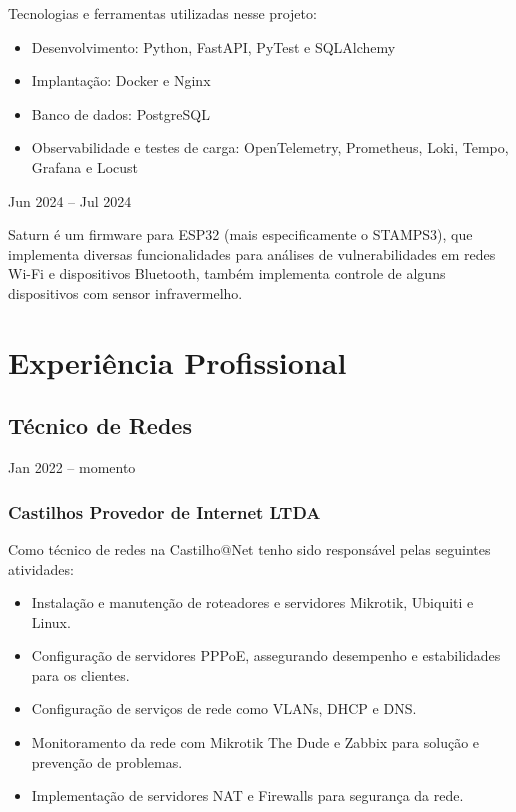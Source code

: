 \documentclass{cv}
\begin{document}
\vspace{0.08cm}

Tecnologias e ferramentas utilizadas nesse projeto:

\begin{itemize}
  \item Desenvolvimento: Python, FastAPI, PyTest e SQLAlchemy
  \item Implantação: Docker e Nginx
  \item Banco de dados: PostgreSQL
  \item Observabilidade e testes de carga: OpenTelemetry, Prometheus,
    Loki, Tempo, Grafana e Locust
\end{itemize}

\hfill{Jun 2024 -- Jul 2024}\\
\vspace{0.15cm}

Saturn é um firmware para ESP32 (mais especificamente o STAMPS3), que implementa diversas funcionalidades
para análises de vulnerabilidades em redes Wi-Fi e dispositivos Bluetooth,
também implementa controle de alguns dispositivos com sensor infravermelho.

\section{Experiência Profissional}

\subsection{Técnico de Redes}
{Jan 2022 -- momento}
\subsubsection{Castilhos Provedor de Internet LTDA}

Como técnico de redes na Castilho@Net tenho sido responsável pelas
seguintes atividades:

\begin{itemize}
  \item Instalação e manutenção de roteadores e servidores Mikrotik,
    Ubiquiti e Linux.
  \item Configuração de servidores PPPoE, assegurando desempenho e
    estabilidades para os clientes.
  \item Configuração de serviços de rede como VLANs, DHCP e DNS.
  \item Monitoramento da rede com Mikrotik The Dude e Zabbix para
    solução e prevenção de problemas.
  \item Implementação de servidores NAT e Firewalls para segurança da rede.
\end{itemize}
\end{document}
